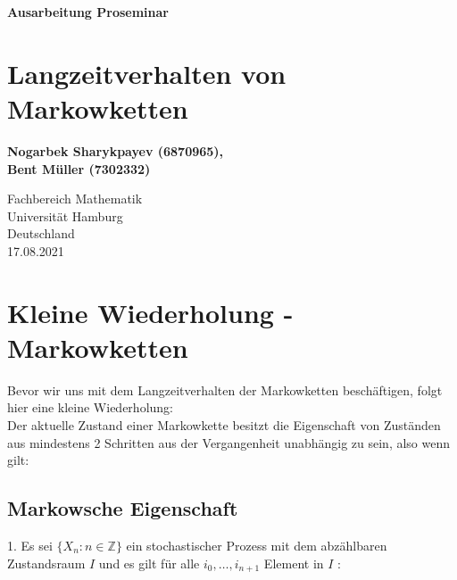 \documentclass[a4paper]{article}
\begin{document}
\begin{titlepage}
   \begin{center}
       \vspace*{1cm}

       \textbf{Ausarbeitung Proseminar}

       \vspace{0.5cm}
	   \section*{
		   Langzeitverhalten von Markowketten
	   }
            
       \vspace{1.5cm}

	   \textbf{Nogarbek Sharykpayev (6870965),\\ Bent Müller (7302332)}

       \vfill
            
       \vspace{0.8cm}
     
            
       Fachbereich Mathematik\\
       Universität Hamburg\\
       Deutschland\\
       17.08.2021
            
   \end{center}
\end{titlepage}

\pagebreak
\tableofcontents
\pagebreak

\section{Kleine Wiederholung - Markowketten}

Bevor wir uns mit dem Langzeitverhalten der Markowketten beschäftigen, folgt hier eine kleine Wiederholung:
\\

Der aktuelle Zustand einer Markowkette besitzt die Eigenschaft von Zuständen aus mindestens 2 Schritten aus der Vergangenheit unabhängig zu sein, also wenn gilt:

\subsection{Markowsche Eigenschaft}

1. Es sei $\{X_n : n \in \mathbb{Z} \}$ ein stochastischer Prozess mit dem abzählbaren Zustandsraum $I$ und es gilt für alle $i_0, …, i_{n+1}$ Element in $I$ : 
\end{document}
